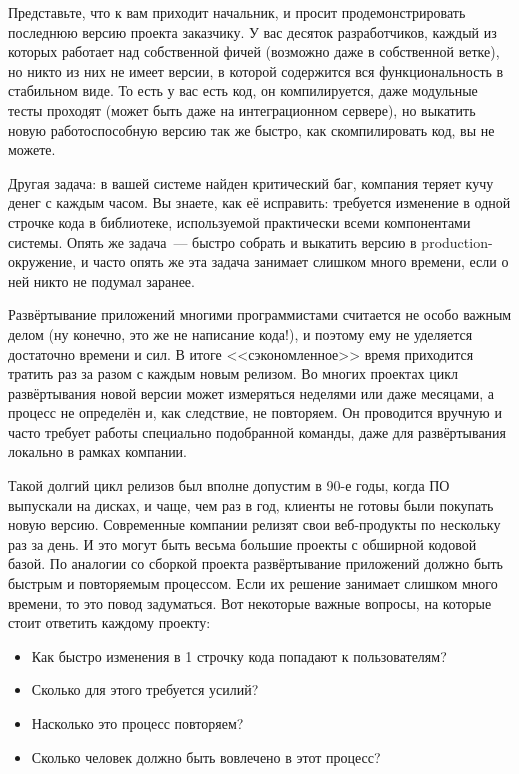\documentclass{../../text-style}
\begin{document}
\maketitle
\thispagestyle{empty}


Представьте, что к вам приходит начальник, и просит продемонстрировать последнюю версию проекта заказчику. У вас десяток разработчиков, каждый из которых работает над собственной фичей (возможно даже в собственной ветке), но никто из них не имеет версии, в которой содержится вся функциональность в стабильном виде. То есть у вас есть код, он компилируется, даже модульные тесты проходят (может быть даже на интеграционном сервере), но выкатить новую работоспособную версию так же быстро, как скомпилировать код, вы не можете.

Другая задача: в вашей системе найден критический баг, компания теряет кучу денег с каждым часом. Вы знаете, как её исправить: требуется изменение в одной строчке кода в библиотеке, используемой практически всеми компонентами системы. Опять же задача~--- быстро собрать и выкатить версию в production-окружение, и часто опять же эта задача занимает слишком много времени, если о ней никто не подумал заранее.

Развёртывание приложений многими программистами считается не особо важным делом (ну конечно, это же не написание кода!), и поэтому ему не уделяется достаточно времени и сил. В итоге <<сэкономленное>> время приходится тратить раз за разом с каждым новым релизом. Во многих проектах цикл развёртывания новой версии может измеряться неделями или даже месяцами, а процесс не определён и, как следствие, не повторяем. Он проводится вручную и часто требует работы специально подобранной команды, даже для развёртывания локально в рамках компании. 

Такой долгий цикл релизов был вполне допустим в 90-е годы, когда ПО выпускали на дисках, и чаще, чем раз в год, клиенты не готовы были покупать новую версию. Современные компании релизят свои веб-продукты по нескольку раз за день. И это могут быть весьма большие проекты с обширной кодовой базой. По аналогии со сборкой проекта развёртывание приложений должно быть быстрым и повторяемым процессом. Если их решение занимает слишком много времени, то это повод задуматься. Вот некоторые важные вопросы, на которые стоит ответить каждому проекту: 

\begin{itemize}
    \item Как быстро изменения в 1 строчку кода попадают к пользователям?
    \item Сколько для этого требуется усилий?
    \item Насколько это процесс повторяем?
    \item Сколько человек должно быть вовлечено в этот процесс?
\end{itemize}
\end{document}
